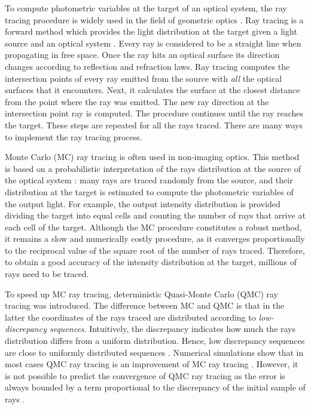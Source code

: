 To compute photometric variables at the target of an
optical system, the ray tracing procedure is widely used in the field of geometric optics \cite{glassner1989introduction}.
Ray tracing is a forward method which provides the light distribution at the target given a light source and an optical system \cite{Gross2005Handbook}. Every ray is considered to be a straight line when propagating in free space. Once the ray hits an optical surface its direction changes according to reflection and refraction laws. Ray tracing computes the intersection points of every ray emitted from the source with \textit{all} the optical surfaces that it encounters. Next, it calculates the surface at the closest distance from the point where the ray was emitted. The new ray direction at the intersection point ray is computed. The procedure continues until the ray reaches the target. These steps are repeated for all the rays traced.
There are many ways to implement the ray tracing process.

Monte Carlo (MC) ray tracing is often used in non-imaging
optics. This method is based on a probabilistic interpretation
of the rays distribution at the source of the optical
system \cite{liu2010precise,Ting:1}: many rays are traced randomly from the source,
and their distribution at the target is estimated to compute the
photometric variables of the output light. For example, the output intensity distribution is provided dividing the target into equal cells and counting the number of rays that arrive at each cell of the target. Although the MC
procedure constitutes a robust method, it remains a slow and
numerically costly procedure, as it converges proportionally
to the reciprocal value of the square root of the number of rays
traced. Therefore, to obtain a good accuracy of the intensity distribution at the target, millions of rays need to be traced.

To speed up MC ray tracing, deterministic Quasi-Monte Carlo (QMC) ray tracing was introduced. The difference between MC and QMC is that in the latter the coordinates of the rays traced are distributed according to \textit{low-discrepancy sequences}. Intuitively, the discrepancy indicates how much the rays distribution differs from a uniform distribution.  Hence, low discrepancy sequences are close to uniformly distributed sequences \cite{levy2002introduction}.
Numerical simulations show that in most cases QMC ray tracing is an improvement of MC ray tracing \cite{ohbuchi1996quasi, caflisch1998monte}. However, it is not possible to predict the convergence of QMC ray tracing as the error is always bounded by a term proportional to the discrepancy of the initial sample of rays \cite{tuffin2004randomization}.

